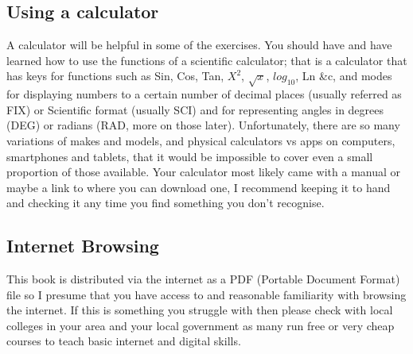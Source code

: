 \subsection{Using a calculator}
A calculator will be helpful in some of the exercises.  You should have and have learned how to use the functions of a scientific calculator; that is a calculator that has keys for functions such as Sin, Cos, Tan, $X^2$, $\sqrt{x}$, $log_10$, Ln \&c, and modes for displaying numbers to a certain number of decimal places (usually referred as FIX) or Scientific format (usually SCI) and for representing angles in degrees (DEG) or radians (RAD, more on those later).  Unfortunately, there are so many variations of makes and models, and physical calculators vs apps on computers, smartphones and tablets, that it would be impossible to cover even a small proportion of those available.  Your calculator most likely came with a manual or maybe a link to where you can download one, I recommend keeping it to hand and checking it any time you find something you don't recognise.

\subsection{Internet Browsing}
This book is distributed via the internet as a PDF (Portable Document Format) file so I presume that you have access to and reasonable familiarity with browsing the internet.  If this is something you struggle with then please check with local colleges in your area and your local government as many run free or very cheap courses to teach basic internet and digital skills.
